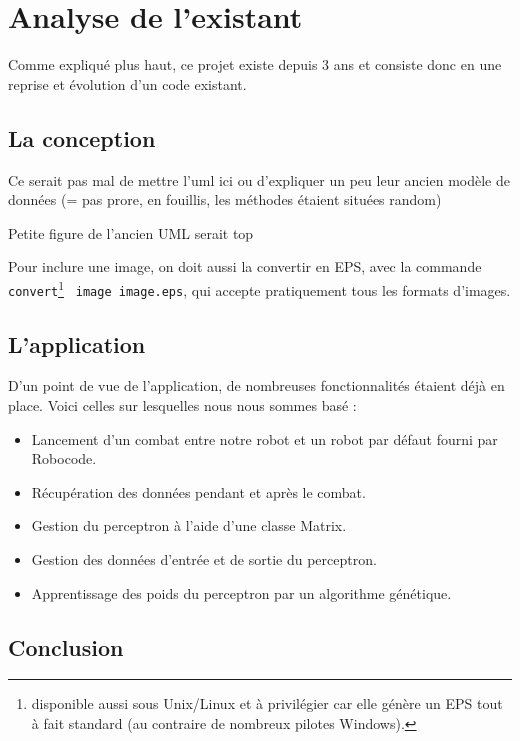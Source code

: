 \documentclass[a4paper,11pt]{article}
\begin{document}
\section{Analyse de l'existant}  

Comme expliqué plus haut, ce projet existe depuis 3 ans et consiste donc en une reprise et évolution d'un code existant. 

\subsection{La conception}

Ce serait pas mal de mettre l'uml ici ou d'expliquer un peu leur ancien modèle de données (= pas prore, en fouillis, les méthodes étaient situées random)

Petite figure de l'ancien UML serait top



Pour inclure une image, on doit aussi la convertir en EPS, avec
la commande \texttt{convert}\footnote{
disponible aussi sous Unix/Linux et à privilégier 
car elle génère un EPS tout à fait standard 
(au contraire de nombreux pilotes Windows).}
\texttt{~image image.eps}, qui accepte pratiquement tous les formats d'images.


\subsection{L'application}

D'un point de vue de l'application, de nombreuses fonctionnalités étaient déjà en place. Voici celles sur lesquelles nous nous sommes basé : 

\begin{itemize}
\item Lancement d'un combat entre notre robot et un robot par défaut fourni par Robocode.
\item Récupération des données pendant et après le combat.
\item Gestion du perceptron à l'aide d'une classe Matrix.
\item Gestion des données d'entrée et de sortie du perceptron.
\item Apprentissage des poids du perceptron par un algorithme génétique.
\end{itemize}

\subsection{Conclusion} 
 
\end{document}
